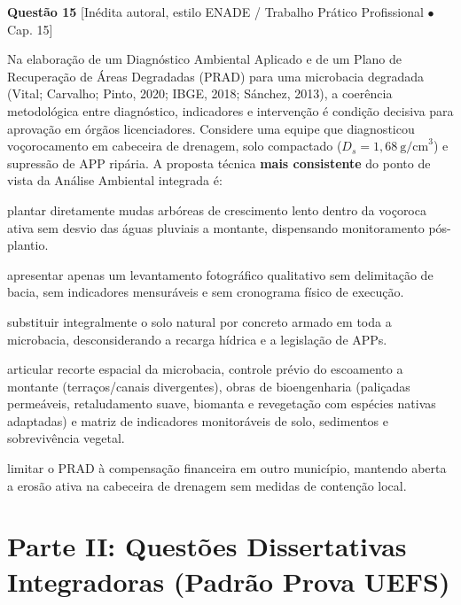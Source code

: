 \vspace{6pt}
\noindent\textbf{Questão 15} {\footnotesize\color{uefsMuted}[Inédita autoral, estilo ENADE / Trabalho Prático Profissional $\bullet$ Cap. 15]}\par
Na elaboração de um Diagnóstico Ambiental Aplicado e de um Plano de Recuperação de Áreas Degradadas (PRAD) para uma microbacia degradada (Vital; Carvalho; Pinto, 2020; IBGE, 2018; Sánchez, 2013), a coerência metodológica entre diagnóstico, indicadores e intervenção é condição decisiva para aprovação em órgãos licenciadores. Considere uma equipe que diagnosticou voçorocamento em cabeceira de drenagem, solo compactado ($D_s = 1,68\ \text{g/cm}^3$) e supressão de APP ripária. A proposta técnica \textbf{mais consistente} do ponto de vista da Análise Ambiental integrada é:
\begin{alternativas}
  \item plantar diretamente mudas arbóreas de crescimento lento dentro da voçoroca ativa sem desvio das águas pluviais a montante, dispensando monitoramento pós-plantio.
  \item apresentar apenas um levantamento fotográfico qualitativo sem delimitação de bacia, sem indicadores mensuráveis e sem cronograma físico de execução.
  \item substituir integralmente o solo natural por concreto armado em toda a microbacia, desconsiderando a recarga hídrica e a legislação de APPs.
  \item articular recorte espacial da microbacia, controle prévio do escoamento a montante (terraços/canais divergentes), obras de bioengenharia (paliçadas permeáveis, retaludamento suave, biomanta e revegetação com espécies nativas adaptadas) e matriz de indicadores monitoráveis de solo, sedimentos e sobrevivência vegetal.
  \item limitar o PRAD à compensação financeira em outro município, mantendo aberta a erosão ativa na cabeceira de drenagem sem medidas de contenção local.
\end{alternativas}

\clearpage
\section*{Parte II: Questões Dissertativas Integradoras (Padrão Prova UEFS)}

